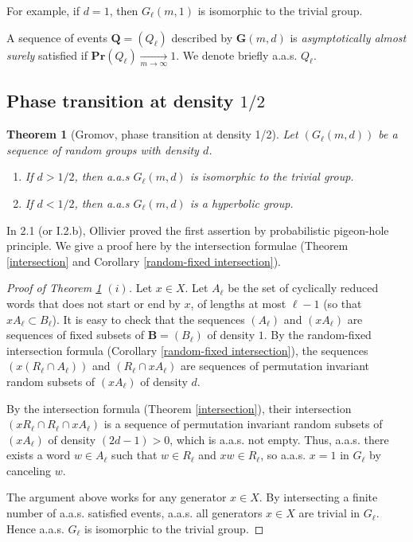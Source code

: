 \documentclass{article}
\newcommand{\bs}{\boldsymbol}
\def\Pr{\mathbf{Pr}}
\newtheorem{thm}{Theorem}[section]
\theoremstyle{remark}
\begin{document}
For example, if $d = 1$, then $G_\ell(m,1)$ is isomorphic to the trivial group.

A sequence of events $\bs Q = (Q_\ell)$ described by $\bs G(m,d)$ is \textit{asymptotically almost surely} satisfied if $\Pr(Q_\ell)\xrightarrow[m\to\infty]{}1$. We denote briefly a.a.s. $Q_\ell$.

\subsection{Phase transition at density $1/2$}

\begin{thm}[Gromov, phase transition at density 1/2]\label{hyp} Let $(G_\ell(m,d))$ be a sequence of random groups with density $d$.
\begin{enumerate} [$(i)$]
    \item If $d > 1/2$, then a.a.s $G_\ell(m,d)$ is isomorphic to the trivial group.
    \item If $d < 1/2$, then a.a.s $G_\ell(m,d)$ is a hyperbolic group.
\end{enumerate}
\end{thm}

In \cite{Oll04} 2.1 (or \cite{Oll05} I.2.b), Ollivier proved the first assertion by probabilistic pigeon-hole principle. We give a proof here by the intersection formulae (Theorem \ref{intersection} and Corollary \ref{random-fixed intersection}).

\begin{proof}[Proof of Theorem \ref{hyp} $(i)$] Let $x\in X$. Let $A_\ell$ be the set of cyclically reduced words that does not start or end by $x$, of lengths at most $\ell-1$ (so that $xA_\ell\subset B_\ell$). It is easy to check that the sequences $(A_\ell)$ and $(xA_\ell)$ are sequences of fixed subsets of $\bs B = (B_\ell)$ of density $1$. By the random-fixed intersection formula (Corollary \ref{random-fixed intersection}), the sequences $(x(R_\ell\cap A_\ell))$ and $(R_\ell\cap xA_\ell)$ are sequences of permutation invariant random subsets of $(xA_\ell)$ of density $d$.

By the intersection formula (Theorem \ref{intersection}), their intersection $(xR_\ell \cap R_\ell \cap xA_\ell)$ is a sequence of permutation invariant random subsets of $(xA_\ell)$ of density $(2d-1)>0$, which is a.a.s. not empty. Thus, a.a.s. there exists a word $w\in A_\ell$ such that $w\in R_\ell$ and $xw\in R_\ell$, so a.a.s. $x=1$ in $G_\ell$ by canceling $w$.

The argument above works for any generator $x\in X$. By intersecting a finite number of a.a.s. satisfied events, a.a.s. all generators $x\in X$ are trivial in $G_\ell$. Hence a.a.s. $G_\ell$ is isomorphic to the trivial group.
\end{proof}\quad
\end{document}
